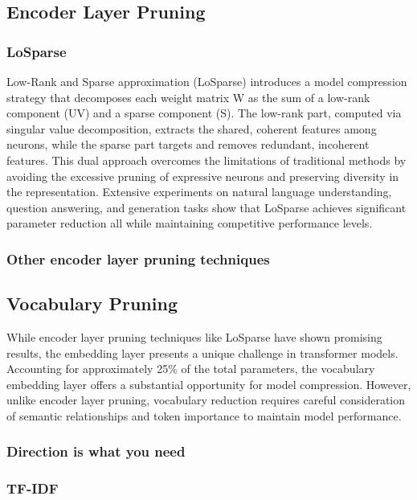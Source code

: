 \documentclass[twocolumn]{article}
\begin{document}
\subsection{Encoder Layer Pruning}

\subsubsection{LoSparse}
Low-Rank and Sparse approximation (LoSparse) introduces a model compression strategy that decomposes each weight matrix W as the sum of a low-rank component (UV) and a sparse component (S). The low-rank part, computed via singular value decomposition, extracts the shared, coherent features among neurons, while the sparse part targets and removes redundant, incoherent features. This dual approach overcomes the limitations of traditional methods by avoiding the excessive pruning of expressive neurons and preserving diversity in the representation. Extensive experiments on natural language understanding, question answering, and generation tasks show that LoSparse achieves significant parameter reduction all while maintaining competitive performance levels.

\subsubsection{Other encoder layer pruning techniques}

\subsection{Vocabulary Pruning}
While encoder layer pruning techniques like LoSparse have shown promising results, the embedding layer presents a unique challenge in transformer models. Accounting for approximately 25\% of the total parameters, the vocabulary embedding layer offers a substantial opportunity for model compression. However, unlike encoder layer pruning, vocabulary reduction requires careful consideration of semantic relationships and token importance to maintain model performance.

\subsubsection{Direction is what you need}
\subsubsection{TF-IDF}
\end{document}
